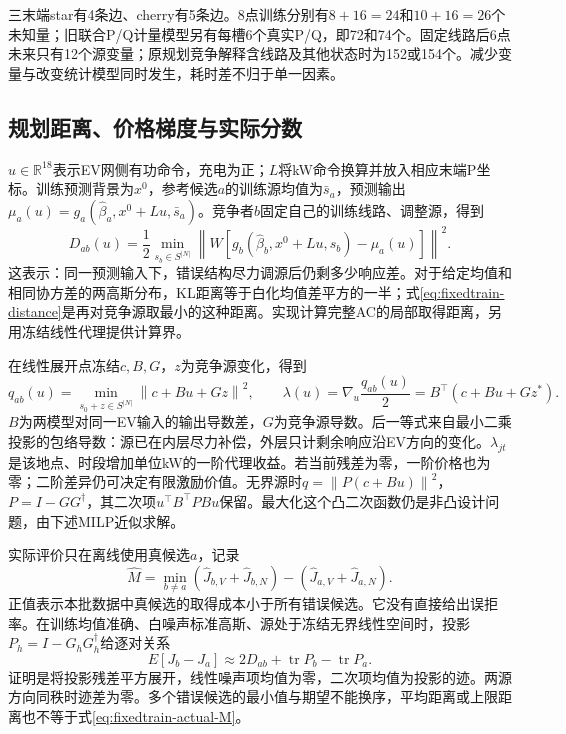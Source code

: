 \documentclass[UTF8,fontset=fandol,11pt,a4paper]{ctexart}
\newcommand{\R}{\mathbb R}
\newcommand{\norm}[1]{\left\lVert#1\right\rVert}
\begin{document}
三末端star有4条边、cherry有5条边。8点训练分别有$8+16=24$和$10+16=26$个未知量；旧联合P/Q计量模型另有每槽6个真实P/Q，即72和74个。固定线路后6点未来只有12个源变量；原规划竞争解释含线路及其他状态时为152或154个。减少变量与改变统计模型同时发生，耗时差不归于单一因素。

\subsection{规划距离、价格梯度与实际分数}
$u\in\R^{18}$表示EV网侧有功命令，充电为正；$L$将kW命令换算并放入相应末端P坐标。训练预测背景为$x^0$，参考候选$a$的训练源均值为$\bar s_a$，预测输出$\mu_a(u)=g_a(\widehat\beta_a,x^0+Lu,\bar s_a)$。竞争者$b$固定自己的训练线路、调整源，得到
\begin{equation}
 D_{ab}(u)=\frac12\min_{s_b\in S^{|N|}}
 \norm{W[g_b(\widehat\beta_b,x^0+Lu,s_b)-\mu_a(u)]}^2.
 \label{eq:fixedtrain-distance}
\end{equation}
这表示：同一预测输入下，错误结构尽力调源后仍剩多少响应差。对于给定均值和相同协方差的两高斯分布，KL距离等于白化均值差平方的一半；式\eqref{eq:fixedtrain-distance}是再对竞争源取最小的这种距离。实现计算完整AC的局部取得距离，另用冻结线性代理提供计算界。

在线性展开点冻结$c,B,G$，$z$为竞争源变化，得到
\begin{equation}
 q_{ab}(u)=\min_{s_0+z\in S^{|N|}}\norm{c+Bu+Gz}^2,
 \qquad \lambda(u)=\nabla_u\frac{q_{ab}(u)}2
 =B^\top(c+Bu+Gz^*).
 \label{eq:fixedtrain-qp-price}
\end{equation}
$B$为两模型对同一EV输入的输出导数差，$G$为竞争源导数。后一等式来自最小二乘投影的包络导数：源已在内层尽力补偿，外层只计剩余响应沿EV方向的变化。$\lambda_{jt}$是该地点、时段增加单位kW的一阶代理收益。若当前残差为零，一阶价格也为零；二阶差异仍可决定有限激励价值。无界源时$q=\norm{P(c+Bu)}^2$，$P=I-GG^\dagger$，其二次项$u^\top B^\top PBu$保留。最大化这个凸二次函数仍是非凸设计问题，由下述MILP近似求解。

实际评价只在离线使用真候选$a$，记录
\begin{equation}
 \widehat M=\min_{b\ne a}
 (\widehat J_{b,V}+\widehat J_{b,N})
 -(\widehat J_{a,V}+\widehat J_{a,N}).
 \label{eq:fixedtrain-actual-M}
\end{equation}
正值表示本批数据中真候选的取得成本小于所有错误候选。它没有直接给出误拒率。在训练均值准确、白噪声标准高斯、源处于冻结无界线性空间时，投影$P_h=I-G_hG_h^\dagger$给逐对关系
\[
 E[J_b-J_a]\approx2D_{ab}+\operatorname{tr}P_b-\operatorname{tr}P_a.
\]
证明是将投影残差平方展开，线性噪声项均值为零，二次项均值为投影的迹。两源方向同秩时迹差为零。多个错误候选的最小值与期望不能换序，平均距离或上限距离也不等于式\eqref{eq:fixedtrain-actual-M}。
\end{document}
